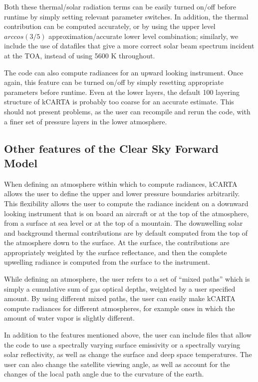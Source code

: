 \documentclass[11pt]{article}
\begin{document}
Both these thermal/solar radiation terms can be easily turned on/off
before runtime by simply setting relevant parameter switches. In
addition, the thermal contribution can be computed accurately, or by
using the upper level $arccos(3/5)$ approximation/accurate lower level
combination; similarly, we include the use of datafiles that give a more
correct solar beam spectrum incident at the TOA, instead of using 
5600 K throughout.

The code can also compute radiances for an upward looking instrument. Once 
again, this feature can be turned on/off by simply resetting appropriate 
parameters before runtime. Even at the lower layers, the default 100 layering
structure of \textsf{kCARTA} is probably too coarse for an accurate
estimate. This should not present problems, as the user can recompile 
and rerun the code, with a finer set of pressure layers in the lower
atmosphere. 

\subsection{Other features of the Clear Sky Forward Model}

When defining an atmosphere within which to compute radiances, {\sf kCARTA} 
allows the user to define the upper and lower pressure boundaries arbitrarily.
This flexibility allows the user to compute the radiance incident on a 
downward looking instrument that is on board an aircraft or at the top of the 
atmosphere, from a surface at sea level or at the top of a mountain. The 
downwelling solar and background thermal contributions are by default 
computed from the top of the atmosphere down to the surface. At the
surface, the contributions are appropriately weighted by the surface
reflectance, and then the complete upwelling radiance is computed from
the surface to the instrument.

While defining an atmosphere, the user refers to a set of ``mixed
paths'' which is simply a cumulative sum of gas optical depths,
weighted by a user specified amount. By using different mixed paths,
the user can easily make \textsf{kCARTA} compute radiances for different
atmospheres, for example ones in which the amount of water vapor is
slightly different.

In addition to the features mentioned above, the user can include files that 
allow the code to use a spectrally varying surface emissivity or a spectrally 
varying solar reflectivity, as well as change the surface and deep space 
temperatures. The user can also change the satellite viewing angle, as well 
as account for the changes of the local path angle due to the curvature of 
the earth.
\end{document}
